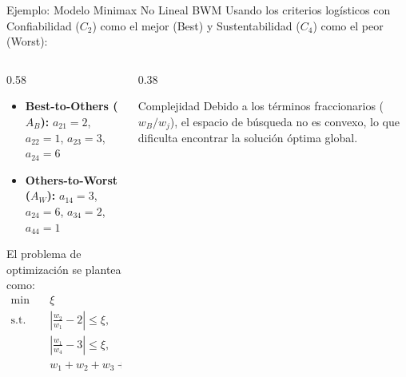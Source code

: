 \documentclass[aspectratio=169, 10pt]{beamer}
\begin{document}
\begin{frame}{Ejemplo: Modelo Minimax No Lineal BWM}
    Usando los criterios logísticos con Confiabilidad ($C_2$) como el mejor (Best) y Sustentabilidad ($C_4$) como el peor (Worst):
    \begin{columns}[T]
        \begin{column}{0.58\textwidth}
            \scriptsize
            \begin{itemize}
                \item \textbf{Best-to-Others ($A_B$):} $a_{21}=2$, $a_{22}=1$, $a_{23}=3$, $a_{24}=6$
                \item \textbf{Others-to-Worst ($A_W$):} $a_{14}=3$, $a_{24}=6$, $a_{34}=2$, $a_{44}=1$
            \end{itemize}
            El problema de optimización se plantea como:
            \[
            \begin{aligned}
                \min \quad & \xi \\
                \text{s.t.} \quad & \left| \frac{w_2}{w_1} - 2 \right| \le \xi, \quad \left| \frac{w_2}{w_3} - 3 \right| \le \xi, \quad \left| \frac{w_2}{w_4} - 6 \right| \le \xi \\
                & \left| \frac{w_1}{w_4} - 3 \right| \le \xi, \quad \left| \frac{w_3}{w_4} - 2 \right| \le \xi \\
                & w_1 + w_2 + w_3 + w_4 = 1, \quad w_j \ge 0
            \end{aligned}
            \]
        \end{column}
        \begin{column}{0.38\textwidth}
            \begin{alertblock}{Complejidad}
                \scriptsize
                Debido a los términos fraccionarios ($w_B/w_j$), el espacio de búsqueda no es convexo, lo que dificulta encontrar la solución óptima global.
            \end{alertblock}
        \end{column}
    \end{columns}
\end{frame}
\end{document}
